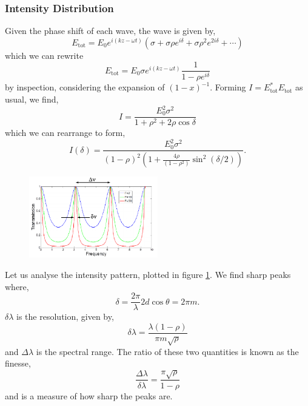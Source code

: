 \documentclass{book}
\begin{document}
{\subsubsection{Intensity Distribution}
Given the phase shift of each wave, the wave is given by,
\begin{equation}
	E_{\text{tot}} = E_0e^{i(kz-\omega t)}(\sigma + \sigma\rho e^{i\delta} + \sigma \rho^2e^{2i\delta} + \cdots) 
\end{equation}
which we can rewrite
\begin{equation}
	E_{\text{tot}} = E_0\sigma e^{i(kz - \omega t)}\frac{1}{1-\rho e^{i\delta}}
\end{equation}
by inspection, considering the expansion of $(1-x)^{-1}$. Forming $I = E_{\text{tot}}^*E_{\text{tot}}$ as usual, we find,
\begin{equation}
	I = \frac{E_0^2\sigma^2}{1 + \rho^2 + 2\rho\cos\delta}
\end{equation}
which we can rearrange to form,
\begin{equation}
	I(\delta) = \frac{E_0^2\sigma^2}{(1-\rho)^2\left(1+\frac{4\rho}{(1-\rho^2)}\sin^2(\delta/2)\right)}.
\end{equation}
\begin{figure}[h]
	\centering
	\includegraphics[width=0.5\textwidth]{fab.png}
	\caption{}
	\label{fig:fab}
\end{figure}
Let us analyse the intensity pattern, plotted in figure \ref{fig:fab}. We find sharp peaks where,
\begin{equation}
	\delta = \frac{2\pi}{\lambda}2d\cos\theta = 2\pi m.
\end{equation}
$\delta \lambda$ is the resolution, given by,
\begin{equation}
	\delta \lambda = \frac{\lambda(1- \rho)}{\pi m \sqrt{\rho}}
\end{equation}
and $\Delta \lambda$ is the spectral range. The ratio of these two quantities is known as the finesse,
\begin{equation}
	\frac{\Delta \lambda}{\delta \lambda} = \frac{\pi \sqrt{\rho}}{1 - \rho}
\end{equation}
and is a measure of how sharp the peaks are. 
}
\end{document}
